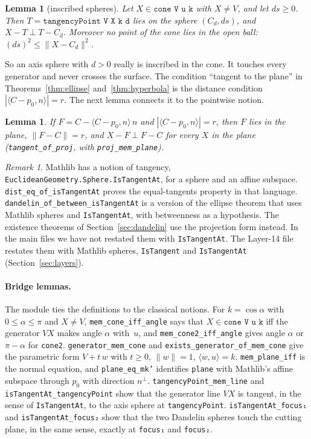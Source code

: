 \documentclass[11pt]{article}
\newtheorem{lemma}[theorem]{Lemma}
\theoremstyle{remark}
\newtheorem{remark}[theorem]{Remark}
\newcommand{\lean}[1]{\texttt{#1}}
\newcommand{\ip}[2]{\langle #1,#2\rangle}
\newcommand{\nm}[1]{\lVert #1\rVert}
\begin{document}
\begin{lemma}[inscribed spheres]\label{lem:inscribed}
Let $X\in\lean{cone V u k}$ with $X\ne V$, and let $ds\ge0$. Then $T=\lean{tangencyPoint V X k d}$ lies on
the sphere $(C_d,ds)$, and $X-T\perp T-C_d$. Moreover no point of the cone lies in the open ball:
$(ds)^2\le\nm{X-C_d}^2$.
\end{lemma}

So an axis sphere with $d>0$ really is inscribed in the cone. It touches every generator and never
crosses the surface. The condition ``tangent to the plane'' in Theorems~\ref{thm:ellipse}
and~\ref{thm:hyperbola} is the distance condition $|\ip{C-p_0}n|=r$. The next lemma connects it
to the pointwise notion.

\begin{lemma}\label{lem:proj}
If $F=C-\ip{C-p_0}n\,n$ and $|\ip{C-p_0}n|=r$, then $F$ lies in the plane, $\nm{F-C}=r$, and
$X-F\perp F-C$ for every $X$ in the plane (\lean{tangent\_of\_proj}, with \lean{proj\_mem\_plane}).
\end{lemma}

\begin{remark}\label{rem:mathlibtangent}
Mathlib has a notion of tangency, \lean{EuclideanGeometry.Sphere.IsTangentAt}, for a sphere and
an affine subspace. \lean{dist\_eq\_of\_isTangentAt} proves the equal-tangents property in that
language. \lean{dandelin\_of\_between\_isTangentAt} is a version of the ellipse theorem that uses
Mathlib spheres and \lean{IsTangentAt}, with betweenness as a hypothesis. The existence theorems
of Section~\ref{sec:dandelin} use the projection form instead. In the main files we have not
restated them with \lean{IsTangentAt}. The Layer-14 file restates them with Mathlib spheres,
\lean{IsTangent} and \lean{IsTangentAt} (Section~\ref{sec:layers}).
\end{remark}

\paragraph{Bridge lemmas.} The module  ties the definitions to the
classical notions. For $k=\cos\alpha$ with $0\le\alpha\le\pi$ and $X\ne V$,
\lean{mem\_cone\_iff\_angle} says that $X\in\lean{cone V u k}$ iff the generator $VX$ makes angle
$\alpha$ with~$u$, and \lean{mem\_cone2\_iff\_angle} gives angle $\alpha$ or $\pi-\alpha$ for
\lean{cone2}. \lean{generator\_mem\_cone} and \lean{exists\_generator\_of\_mem\_cone} give the
parametric form $V+t\,w$ with $t\ge0$, $\nm w=1$, $\ip wu=k$. \lean{mem\_plane\_iff} is the normal
equation, and \lean{plane\_eq\_mk'} identifies \lean{plane} with Mathlib's affine subspace through
$p_0$ with direction $n^\perp$. \lean{tangencyPoint\_mem\_line} and
\lean{isTangentAt\_tangencyPoint} show that the generator line $VX$ is tangent, in the sense of
\lean{IsTangentAt}, to the axis sphere at \lean{tangencyPoint}. \lean{isTangentAt\_focus₁} and
\lean{isTangentAt\_focus₂} show that the two Dandelin spheres touch the cutting plane, in the same
sense, exactly at \lean{focus₁} and \lean{focus₂}.
\end{document}
